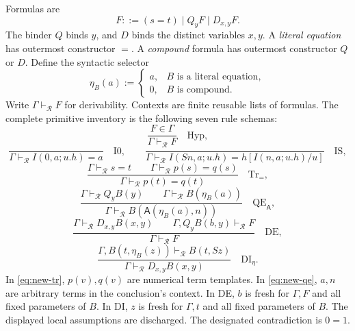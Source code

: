\documentclass[11pt,a4paper]{article}
\theoremstyle{definition}\newtheorem{definition}[theorem]{Definition}
\begin{document}
Formulas are
\begin{equation}
 F ::= (s=t)\mid Q_yF\mid D_{x,y}F.
 \label{eq:new-formulas}
\end{equation}
The binder $Q$ binds $y$, and $D$ binds the distinct variables $x,y$.
A \emph{literal equation} has outermost constructor $=$.  A \emph{compound}
formula has outermost constructor $Q$ or $D$.  Define the syntactic selector
\begin{equation}
 \eta_B(a):=
 \begin{cases}
 a,&B\text{ is a literal equation},\\
 0,&B\text{ is compound}.
 \end{cases}
 \label{eq:new-eta}
\end{equation}
Write $\Gamma\vdash_{\mathcal R}F$ for derivability.  Contexts are finite
reusable lists of formulas.  The complete primitive inventory is the following
seven rule schemas:
\[
 \frac{F\in\Gamma}{\Gamma\vdash_{\mathcal R}F}
 \quad\mathrm{Hyp},
\]
\[
 \frac{}{\Gamma\vdash_{\mathcal R}I(0,a;u.h)=a}
 \quad\mathrm{I0},\qquad
 \frac{}{\Gamma\vdash_{\mathcal R}
 I(Sn,a;u.h)=h[I(n,a;u.h)/u]}
 \quad\mathrm{IS},
\]
\begin{equation}
 \frac{\Gamma\vdash_{\mathcal R}s=t\qquad
       \Gamma\vdash_{\mathcal R}p(s)=q(s)}
      {\Gamma\vdash_{\mathcal R}p(t)=q(t)}
 \quad\mathrm{Tr}_{=},
 \label{eq:new-tr}
\end{equation}
\begin{equation}
 \frac{\Gamma\vdash_{\mathcal R}Q_yB(y)\qquad
       \Gamma\vdash_{\mathcal R}B(\eta_B(a))}
      {\Gamma\vdash_{\mathcal R}
         B(\mathsf A(\eta_B(a),n))}
 \quad\mathrm{QE}_{\mathsf A},
 \label{eq:new-qe}
\end{equation}
\begin{equation}
 \frac{\Gamma\vdash_{\mathcal R}D_{x,y}B(x,y)\qquad
       \Gamma,Q_yB(b,y)\vdash_{\mathcal R}F}
      {\Gamma\vdash_{\mathcal R}F}
 \quad\mathrm{DE},
 \label{eq:new-de}
\end{equation}
\begin{equation}
 \frac{\Gamma,B(t,\eta_B(z))\vdash_{\mathcal R}B(t,Sz)}
      {\Gamma\vdash_{\mathcal R}D_{x,y}B(x,y)}
 \quad\mathrm{DI}_{\eta}.
 \label{eq:new-di}
\end{equation}
In \eqref{eq:new-tr}, $p(v),q(v)$ are numerical term templates.  In
\eqref{eq:new-qe}, $a,n$ are arbitrary terms in the conclusion's context.
In DE, $b$ is fresh for $\Gamma,F$ and all fixed parameters of $B$.
In DI, $z$ is fresh for $\Gamma,t$ and all fixed parameters of $B$.
The displayed local assumptions are discharged.  The designated
contradiction is $0=1$.
\end{document}
